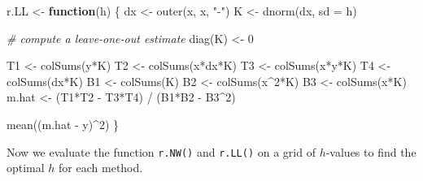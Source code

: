 \documentclass[
  a4paper,
]{article}
\newenvironment{Shaded}{\begin{snugshade}}{\end{snugshade}}
\newcommand{\AttributeTok}[1]{\textcolor[rgb]{0.77,0.63,0.00}{#1}}
\newcommand{\CommentTok}[1]{\textcolor[rgb]{0.56,0.35,0.01}{\textit{#1}}}
\newcommand{\ControlFlowTok}[1]{\textcolor[rgb]{0.13,0.29,0.53}{\textbf{#1}}}
\newcommand{\DecValTok}[1]{\textcolor[rgb]{0.00,0.00,0.81}{#1}}
\newcommand{\FunctionTok}[1]{\textcolor[rgb]{0.00,0.00,0.00}{#1}}
\newcommand{\NormalTok}[1]{#1}
\newcommand{\OtherTok}[1]{\textcolor[rgb]{0.56,0.35,0.01}{#1}}
\newcommand{\SpecialCharTok}[1]{\textcolor[rgb]{0.00,0.00,0.00}{#1}}
\newcommand{\StringTok}[1]{\textcolor[rgb]{0.31,0.60,0.02}{#1}}
\theoremstyle{definition}
\theoremstyle{definition}
\theoremstyle{definition}
\theoremstyle{definition}
\theoremstyle{remark}
\begin{document}
\begin{Shaded}
\begin{Highlighting}[]
\NormalTok{r.LL }\OtherTok{\textless{}{-}} \ControlFlowTok{function}\NormalTok{(h) \{}
\NormalTok{    dx }\OtherTok{\textless{}{-}} \FunctionTok{outer}\NormalTok{(x, x, }\StringTok{"{-}"}\NormalTok{)}
\NormalTok{    K }\OtherTok{\textless{}{-}} \FunctionTok{dnorm}\NormalTok{(dx, }\AttributeTok{sd =}\NormalTok{ h)}

    \CommentTok{\# compute a leave{-}one{-}out estimate}
    \FunctionTok{diag}\NormalTok{(K) }\OtherTok{\textless{}{-}} \DecValTok{0}

\NormalTok{    T1 }\OtherTok{\textless{}{-}} \FunctionTok{colSums}\NormalTok{(y}\SpecialCharTok{*}\NormalTok{K)}
\NormalTok{    T2 }\OtherTok{\textless{}{-}} \FunctionTok{colSums}\NormalTok{(x}\SpecialCharTok{*}\NormalTok{dx}\SpecialCharTok{*}\NormalTok{K)}
\NormalTok{    T3 }\OtherTok{\textless{}{-}} \FunctionTok{colSums}\NormalTok{(x}\SpecialCharTok{*}\NormalTok{y}\SpecialCharTok{*}\NormalTok{K)}
\NormalTok{    T4 }\OtherTok{\textless{}{-}} \FunctionTok{colSums}\NormalTok{(dx}\SpecialCharTok{*}\NormalTok{K)}
\NormalTok{    B1 }\OtherTok{\textless{}{-}} \FunctionTok{colSums}\NormalTok{(K)}
\NormalTok{    B2 }\OtherTok{\textless{}{-}} \FunctionTok{colSums}\NormalTok{(x}\SpecialCharTok{\^{}}\DecValTok{2}\SpecialCharTok{*}\NormalTok{K)}
\NormalTok{    B3 }\OtherTok{\textless{}{-}} \FunctionTok{colSums}\NormalTok{(x}\SpecialCharTok{*}\NormalTok{K)}
\NormalTok{    m.hat }\OtherTok{\textless{}{-}}\NormalTok{ (T1}\SpecialCharTok{*}\NormalTok{T2 }\SpecialCharTok{{-}}\NormalTok{ T3}\SpecialCharTok{*}\NormalTok{T4) }\SpecialCharTok{/}\NormalTok{ (B1}\SpecialCharTok{*}\NormalTok{B2 }\SpecialCharTok{{-}}\NormalTok{ B3}\SpecialCharTok{\^{}}\DecValTok{2}\NormalTok{)}

    \FunctionTok{mean}\NormalTok{((m.hat }\SpecialCharTok{{-}}\NormalTok{ y)}\SpecialCharTok{\^{}}\DecValTok{2}\NormalTok{)}
\NormalTok{\}}
\end{Highlighting}
\end{Shaded}

Now we evaluate the function \texttt{r.NW()} and \texttt{r.LL()} on a grid of \(h\)-values
to find the optimal \(h\) for each method.
\end{document}
